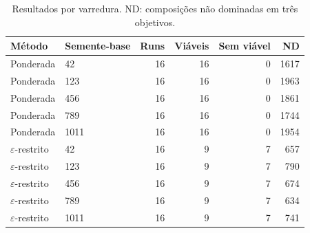 \begin{table}[H]\centering
\caption{Resultados por varredura. ND: composições não dominadas em três objetivos.}
\label{tab:tp2_repeticoes}
\begin{tabular}{llrrrr}\toprule
Método & Semente-base & Runs & Viáveis & Sem viável & ND \\ \midrule
Ponderada & 42 & 16 & 16 & 0 & 1617 \\
Ponderada & 123 & 16 & 16 & 0 & 1963 \\
Ponderada & 456 & 16 & 16 & 0 & 1861 \\
Ponderada & 789 & 16 & 16 & 0 & 1744 \\
Ponderada & 1011 & 16 & 16 & 0 & 1954 \\
$\varepsilon$-restrito & 42 & 16 & 9 & 7 & 657 \\
$\varepsilon$-restrito & 123 & 16 & 9 & 7 & 790 \\
$\varepsilon$-restrito & 456 & 16 & 9 & 7 & 674 \\
$\varepsilon$-restrito & 789 & 16 & 9 & 7 & 634 \\
$\varepsilon$-restrito & 1011 & 16 & 9 & 7 & 741 \\
\bottomrule\end{tabular}
\end{table}
